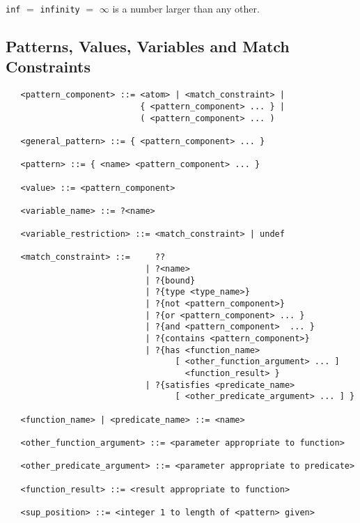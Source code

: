 {\tt inf} $=$ {\tt infinity} $=$ $\infty$ is a number larger than any other.

\subsection{Patterns, Values, Variables and Match Constraints}


\begin{verbatim}
   <pattern_component> ::= <atom> | <match_constraint> |
                           { <pattern_component> ... } |
                           ( <pattern_component> ... )
   
   <general_pattern> ::= { <pattern_component> ... }

   <pattern> ::= { <name> <pattern_component> ... }

   <value> ::= <pattern_component>

   <variable_name> ::= ?<name>

   <variable_restriction> ::= <match_constraint> | undef

   <match_constraint> ::=     ??
                            | ?<name>
                            | ?{bound}
                            | ?{type <type_name>}
                            | ?{not <pattern_component>}
                            | ?{or <pattern_component> ... }
                            | ?{and <pattern_component>  ... }
                            | ?{contains <pattern_component>}
                            | ?{has <function_name>
                                  [ <other_function_argument> ... ]
                                    <function_result> }
                            | ?{satisfies <predicate_name>
                                  [ <other_predicate_argument> ... ] }
 
   <function_name> | <predicate_name> ::= <name>
 
   <other_function_argument> ::= <parameter appropriate to function>

   <other_predicate_argument> ::= <parameter appropriate to predicate>
 
   <function_result> ::= <result appropriate to function>
 
   <sup_position> ::= <integer 1 to length of <pattern> given>
\end{verbatim}

